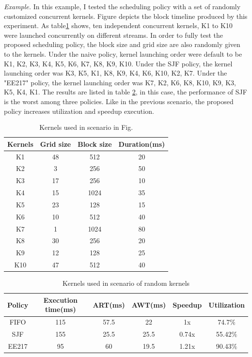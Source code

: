 \documentclass[12pt,journal,compsoc]{IEEEtran}
\begin{document}
\textit{Example.}
In this example, I tested the scheduling policy with a set of randomly customized concurrent kernels. Figure depicts the block timeline produced by this experiment. As table\ref{table:scenario2_kernel} shows, ten independent concurrent kernels, K1 to K10 were launched concurrently on different streams. In order to fully test the proposed scheduling policy, the block size and grid size are also randomly given to the kernels. Under the naive policy, kernel launching order were default to be K1, K2, K3, K4, K5, K6, K7, K8, K9, K10. Under the SJF policy, the kernel launching order was K3, K5, K1, K8, K9, K4, K6, K10, K2, K7. Under the "EE217" policy, the kernel launching order was K7, K2, K6, K8, K10, K9, K3, K5, K4, K1. The results are listed in table \ref{table:scenario2_result}, in this case, the performance of SJF is the worst among three policies. Like in the previous scenario, the proposed policy increases utilization and speedup execution.

\begin{table}[ht]
   \caption{Kernels used in scenario in Fig. } %
   \centering
   \begin{tabular}{|c|c|c|c|}
   \hline
   \bf Kernels & \bf Grid size & \bf Block size & \bf Duration(ms)\\
   \hline
   K1 & 48 & 512 & 20 \\
   K2 & 3 & 256 & 50\\ 
   K3 & 17 & 256 & 10 \\
   K4 & 15 & 1024 & 35 \\
   K5 & 23 & 128 & 15 \\ 
   K6 & 10 & 512 & 40 \\
   K7 & 1 & 1024 & 80 \\
   K8 & 30 & 256 & 20\\ 
   K9 & 12 & 128 & 25 \\
   K10 & 47 & 512 & 40 \\
   \hline
   \end{tabular}
   \label{table:scenario2_kernel}
\end{table}

\begin{table}[ht]
   \caption{Kernels used in scenario of random kernels} %
   \centering
   \begin{tabular}{|c|c|c|c|c|c|}
   \hline
   \bf Policy & \bf Execution time(ms)& \bf ART(ms) & \bf AWT(ms) & \bf Speedup & \bf Utilization \\
   \hline
   FIFO & 115 & 57.5 & 22 & 1x & 74.7$\%$ \\
   SJF & 155 & 25.5 & 25.5 & 0.74x & 55.42$\%$ \\ 
   EE217 & 95 & 60 & 19.5 & 1.21x & 90.43$\%$ \\
   \hline
   \end{tabular}
   \label{table:scenario2_result}
\end{table}
\end{document}
